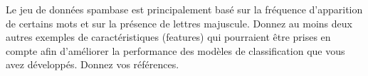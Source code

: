 \begin{homeworkProblem}
\begin{homeworkSection}{4.2}
		\end{homeworkSection}
			
		\begin{homeworkSection}{4.3}

			Le jeu de données spambase est principalement basé sur la fréquence d’apparition de
			certains mots et sur la présence de lettres majuscule. Donnez au moins deux autres
			exemples de caractéristiques (features) qui pourraient être prises en compte afin
			d’améliorer la performance des modèles de classification que vous avez développés.
			Donnez vos références. \\

					
		\end{homeworkSection}
		
			
	\end{homeworkProblem}